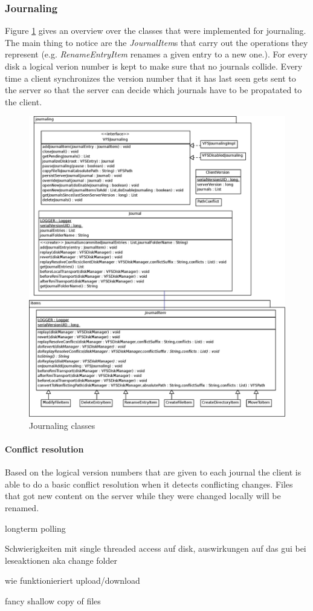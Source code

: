 \subsubsection{Journaling}
Figure \ref{fig:journaling_classes} gives an overview over the classes that
were implemented for journaling. The main thing to notice are the
\textit{JournalItem}s that carry out the operations they represent (e.g.
\textit{RenameEntryItem} renames a given entry to a new one.). For every disk a
logical verion number is kept to make sure that no journals collide. Every time
a client synchronizes the version number that it has last seen gets sent to the
server so that the server can decide which journals have to be propatated to the
client.

\begin{figure}[h!]
\centering
\includegraphics[width=1\textwidth]{figures/22Journaling.eps}
\caption{Journaling classes}
\label{fig:journaling_classes}
\end{figure}

\paragraph{Conflict resolution}
Based on the logical version numbers that are given to each journal the client
is able to do a basic conflict resolution when it detects conflicting changes.
Files that got new content on the server while they were changed locally will be
renamed.


longterm polling

Schwierigkeiten mit single threaded access auf disk, auswirkungen auf das gui bei leseaktionen aka change folder


wie funktionieriert upload/download



 fancy shallow copy of files
